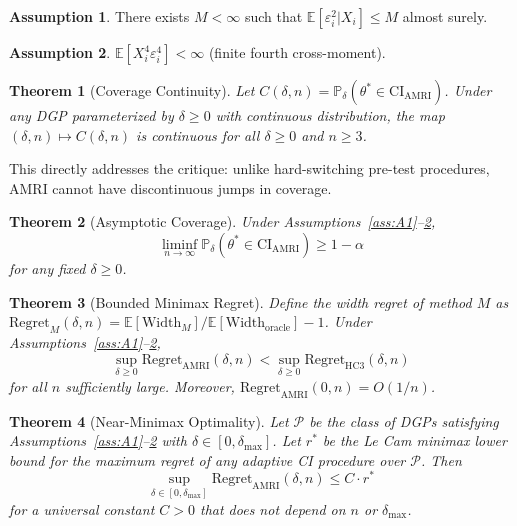 \documentclass[12pt]{article}
\newtheorem{theorem}{Theorem}
\theoremstyle{definition}
\newtheorem{assumption}{Assumption}
\theoremstyle{remark}
\newcommand{\E}{\mathbb{E}}
\newcommand{\Prob}{\mathbb{P}}
\newcommand{\CI}{\mathrm{CI}}
\begin{document}
\begin{assumption}\label{ass:A2}
There exists $M < \infty$ such that $\E[\varepsilon_i^2 | X_i] \leq M$ almost surely.
\end{assumption}

\begin{assumption}\label{ass:A3}
$\E[X_i^4 \varepsilon_i^4] < \infty$ (finite fourth cross-moment).
\end{assumption}

\begin{theorem}[Coverage Continuity]\label{thm:continuity}
Let $C(\delta, n) = \Prob_\delta(\theta^* \in \CI_{\mathrm{AMRI}})$. Under any DGP parameterized by $\delta \geq 0$ with continuous distribution, the map $(\delta, n) \mapsto C(\delta, n)$ is continuous for all $\delta \geq 0$ and $n \geq 3$.
\end{theorem}

This directly addresses the \citet{leeb2005model} critique: unlike hard-switching pre-test procedures, AMRI cannot have discontinuous jumps in coverage.

\begin{theorem}[Asymptotic Coverage]\label{thm:coverage}
Under Assumptions~\ref{ass:A1}--\ref{ass:A3},
\[
\liminf_{n \to \infty} \Prob_\delta\!\left(\theta^* \in \CI_{\mathrm{AMRI}}\right) \geq 1 - \alpha
\]
for any fixed $\delta \geq 0$.
\end{theorem}

\begin{theorem}[Bounded Minimax Regret]\label{thm:regret}
Define the width regret of method $M$ as $\mathrm{Regret}_M(\delta, n) = \E[\mathrm{Width}_M] / \E[\mathrm{Width}_{\mathrm{oracle}}] - 1$. Under Assumptions~\ref{ass:A1}--\ref{ass:A3},
\[
\sup_{\delta \geq 0} \mathrm{Regret}_{\mathrm{AMRI}}(\delta, n) < \sup_{\delta \geq 0} \mathrm{Regret}_{\mathrm{HC3}}(\delta, n)
\]
for all $n$ sufficiently large. Moreover, $\mathrm{Regret}_{\mathrm{AMRI}}(0, n) = O(1/n)$.
\end{theorem}

\begin{theorem}[Near-Minimax Optimality]\label{thm:minimax}
Let $\mathcal{P}$ be the class of DGPs satisfying Assumptions~\ref{ass:A1}--\ref{ass:A3} with $\delta \in [0, \delta_{\max}]$. Let $r^*$ be the Le Cam minimax lower bound for the maximum regret of any adaptive CI procedure over $\mathcal{P}$. Then
\[
\sup_{\delta \in [0, \delta_{\max}]} \mathrm{Regret}_{\mathrm{AMRI}}(\delta, n) \leq C \cdot r^*
\]
for a universal constant $C > 0$ that does not depend on $n$ or $\delta_{\max}$.
\end{theorem}
\end{document}

